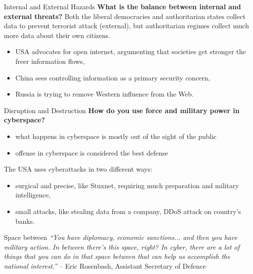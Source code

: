 \documentclass[xcolor=table]{beamer}
\begin{document}
\begin{frame}{Internal and External Hazards}
\textbf{What is the balance between internal and external threats?} \newline
Both the liberal democracies and authoritarian states collect data to prevent terrorist attack (external),
but authoritarian regimes collect much more data about their own citizens.
\begin{itemize}
\item USA advocates for open internet, argumenting that societies get stronger the freer information flows,
\item China sees controlling information as a primary security concern,
\item Russia is trying to remove Western influence from the Web.
\end{itemize}

\end{frame}

\begin{frame}{Disruption and Destruction}
\textbf{How do you use force and military power in cyberspace?}
\begin{itemize}
\item what happens in cyberspace is mostly out of the sight of the public
\item offense in cyberspace is considered the best defense
\end{itemize}
The USA uses cyberattacks in two different ways:
\begin{itemize}
\item surgical and precise, like Stuxnet, requiring much preparation and military intelligence,
\item small attacks, like stealing data from a company, DDoS attack on country's banks.
\end{itemize}
\end{frame}

\begin{frame}{Space between}
\textit{``You have diplomacy, economic sanctions... and then you
have military action. In between there’s this space, right? In cyber,
there are a lot of things that you can do in that space between that can
help us accomplish the national interest.''} -- Eric Rosenbash, Assistant Secretary of Defence
\end{frame}
\end{document}
